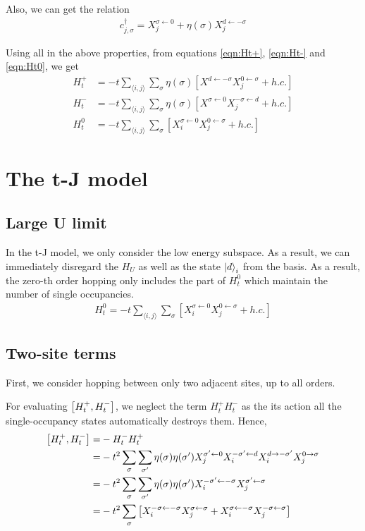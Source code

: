 \documentclass[]{report}
\begin{document}
Also, we can get the relation
\begin{align}
c^{\dagger}_{j, \sigma} = X^{\sigma \leftarrow 0}_j + \eta(\sigma) X^{d \leftarrow -\sigma}_{j}
\end{align}

Using all in the above properties, from equations \eqref{eqn:Ht+}, \eqref{eqn:Ht-} and \eqref{eqn:Ht0}, we get
\begin{align}
\label{eqn:Ht+hubbard}
H^{+}_{t} &= -t \sum_{\langle i, j \rangle} \sum_{\sigma} \eta(\sigma) \left[ X^{d \leftarrow -\sigma} X^{0 \leftarrow \sigma}_j + h.c. \right]\\
\label{eqn:Ht-hubbard}
H^{-}_{t} &= -t \sum_{\langle i, j \rangle} \sum_{\sigma} \eta(\sigma) \left[ X^{\sigma \leftarrow 0} X^{-\sigma \leftarrow d}_j + h.c. \right]\\
H^{0}_{t} &= -t \sum_{\langle i, j \rangle} \sum_{\sigma} \left[ X^{\sigma \leftarrow 0}_{i} X^{0 \leftarrow \sigma}_{j} + h.c. \right]
\end{align}

\chapter{The t-J model}
\section{Large U limit}
In the t-J model, we only consider the low energy subspace. As a result, we can immediately disregard the $ H_U $ as well as the state $ \ket{d}_i $ from the basis. As a result, the zero-th order hopping only includes the part of $ H^{0}_{t} $ which maintain the number of single occupancies.
\begin{align}
H^{0}_{t} = -t \sum_{\langle i, j \rangle} \sum_{\sigma} \left[ X^{\sigma \leftarrow 0}_i X^{0 \leftarrow \sigma}_j + h.c. \right]
\end{align}

\section{Two-site terms}
First, we consider hopping between only two adjacent sites, up to all orders.

For evaluating $ \comm{H^{+}_{t}}{H^{-}_{t}} $, we neglect the term $ H^{+}_{t} H^{-}_{t} $ as the its action all the single-occupancy states automatically destroys them. Hence,
\begin{align}
\nonumber
\comm{H^{+}_{t}}{H^{-}_{t}} =&  -H^{-}_{t} H^{+}_{t}\\
\nonumber
=& -t^2 \sum_{\sigma} \sum_{\sigma'} \eta(\sigma) \eta(\sigma') X^{\sigma' \leftarrow 0}_j X^{-\sigma' \leftarrow d}_i X^{d \rightarrow-\sigma'}_i X^{0 \rightarrow \sigma}_j\\
\nonumber
=& -t^2 \sum_{\sigma} \sum_{\sigma'} \eta(\sigma) \eta(\sigma')  X^{-\sigma' \leftarrow -\sigma}_i X^{\sigma' \leftarrow \sigma}_j\\
=& -t^2 \sum_{\sigma}\left[ X^{-\sigma \leftarrow -\sigma}_i  X^{\sigma \leftarrow \sigma}_j + X^{\sigma \leftarrow -\sigma}_i  X^{-\sigma \leftarrow \sigma}_j \right]
\end{align}
\end{document}
